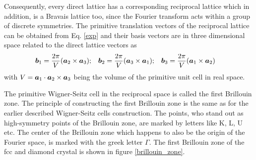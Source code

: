 		Consequently, every direct lattice has a corresponding reciprocal lattice which in addition, is a Bravais lattice too, since the Fourier transform acts within a group of discrete symmetries.		
		The primitive translation vectors of the reciprocal lattice can be obtained from Eq. \ref{exp} and their basis vectors are in three dimensional space related to the direct lattice vectors as
		\begin{align}
			\boldsymbol{b}_1 &= \frac{2\pi}{V}(\boldsymbol{a}_2 \times \boldsymbol{a}_3); &
			\boldsymbol{b}_2 &= \frac{2\pi}{V}(\boldsymbol{a}_3 \times \boldsymbol{a}_1); &
			\boldsymbol{b}_3 &= \frac{2\pi}{V}(\boldsymbol{a}_1 \times \boldsymbol{a}_2)
		\end{align} 
		with $V=\boldsymbol{a}_1 \cdot \boldsymbol{a}_2 \times \boldsymbol{a}_3$ being the volume of the primitive unit cell in real space.
		 
		The primitive Wigner-Seitz cell in the reciprocal space is called the first Brillouin zone. 
		The principle of constructing the first Brillouin zone is the same as for the earlier described Wigner-Seitz cells construction. The points, who stand out as high-symmetry points of the Brillouin zone, are marked by letters like K, L, U etc. The center of the Brillouin zone which happens to also be the origin of the Fourier space, is marked with the greek letter $\Gamma$.  
		The first Brillouin zone of the fcc and diamond crystal is shown in figure  \ref{brillouin_zone}.		


		
